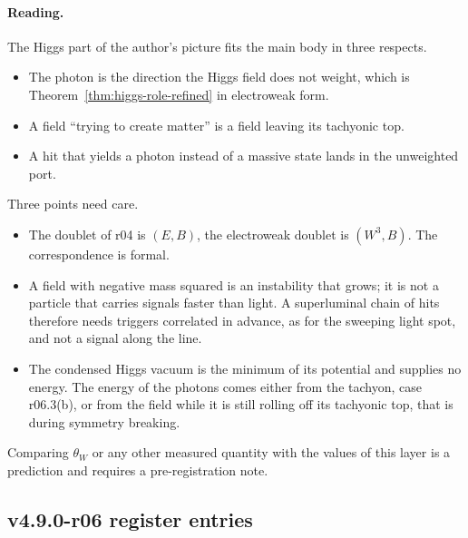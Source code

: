 \paragraph{Reading.}
The Higgs part of the author's picture fits the main body in three respects.
\begin{itemize}[leftmargin=2em]
\item The photon is the direction the Higgs field does not weight, which is Theorem~\ref{thm:higgs-role-refined} in
electroweak form.
\item A field ``trying to create matter'' is a field leaving its tachyonic top.
\item A hit that yields a photon instead of a massive state lands in the unweighted port.
\end{itemize}
Three points need care.
\begin{itemize}[leftmargin=2em]
\item The doublet of r04 is \((E,B)\), the electroweak doublet is \((W^3,B)\).  The correspondence is formal.
\item A field with negative mass squared is an instability that grows; it is not a particle that carries signals faster
than light.  A superluminal chain of hits therefore needs triggers correlated in advance, as for the sweeping light spot,
and not a signal along the line.
\item The condensed Higgs vacuum is the minimum of its potential and supplies no energy.  The energy of the photons comes
either from the tachyon, case r06.3(b), or from the field while it is still rolling off its tachyonic top, that is during
symmetry breaking.
\end{itemize}
Comparing \(\theta_W\) or any other measured quantity with the values of this layer is a prediction and requires a
pre-registration note.

\subsection*{v4.9.0-r06 register entries}
\label{subsec:v490-r06-register}

